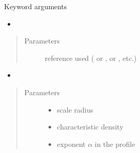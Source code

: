 \documentclass[letterpaper,10pt,english]{sphinxmanual}
\begin{document}
\begin{fulllineitems}
\begin{quote}
\begin{description}
\begin{itemize}
\end{itemize}

\end{description}\end{quote}

\sphinxAtStartPar
Keyword arguments
\begin{itemize}
\item {} 
\sphinxAtStartPar
{}

\end{itemize}
\begin{quote}\begin{description}
\item[{Parameters}] \leavevmode
\sphinxAtStartPar
{} \textendash{} reference used ( or \sphinxcode{\sphinxupquote{\textquotesingle{}1309.2641\textquotesingle{}}},  or \sphinxcode{\sphinxupquote{\textquotesingle{}1408.0002\textquotesingle{}}}, etc.)

\end{description}\end{quote}
\begin{itemize}
\item {} 
\sphinxAtStartPar
{}

\end{itemize}
\begin{quote}\begin{description}
\item[{Parameters}] \leavevmode\begin{itemize}
\item {} 
\sphinxAtStartPar
{} \textendash{} scale radius

\item {} 
\sphinxAtStartPar
{} \textendash{} characteristic density

\item {} 
\sphinxAtStartPar
{} \textendash{} exponent \(\alpha\) in the {\hyperref[\detokenize{diffsph.profiles:diffsph.profiles.templates.hdz}]{}} profile


\end{itemize}
\end{description}
\end{quote}
\end{fulllineitems}
\end{document}
